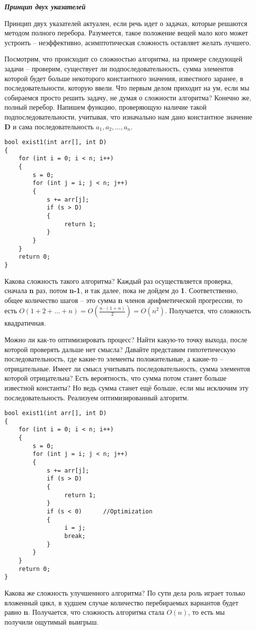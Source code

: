 \documentclass [a4paper,12pt] {report}
\begin{document}
\begin{center}
{\Large \bfseries \slshape Принцип двух указателей}
\end{center}

Принцип двух указателей актуален, если речь идет о задачах, которые решаются методом полного перебора. Разумеется, такое положение вещей мало кого может устроить – неэффективно, асимптотическая сложность оставляет желать лучшего. 

Посмотрим, что происходит со сложностью алгоритма, на примере следующей задачи – проверим, существует ли подпоследовательность, сумма элементов которой будет больше некоторого константного значения, известного заранее, в последовательности, которую ввели. Что первым делом приходит на ум, если мы собираемся просто решить задачу, не думая о сложности алгоритма? Конечно же, полный перебор. Напишем функцию, проверяющую наличие такой подпоследовательности, учитывая, что изначально нам дано константное значение {\bfseries  D} и сама последовательность {\bfseries  $a_{1}, a_{2}, … , a_{n}$}.

\lstset {language = C++, frame = single}
\begin{lstlisting}
bool exist1(int arr[], int D)
{
    for (int i = 0; i < n; i++)
    {
        s = 0;
        for (int j = i; j < n; j++)
        {
            s += arr[j];
            if (s > D)
            {
                 return 1;
            }
        }
    }
	return 0;
}
\end{lstlisting}

Какова сложность такого алгоритма? Каждый раз осуществляется проверка, сначала {\bfseries n} раз, потом {\bfseries n-1}, и так далее, пока не дойдем до {\bfseries 1}. Соответственно, общее количество шагов – это сумма {\bfseries n} членов арифметической прогрессии, то есть $O(1 + 2 + … + n) = O(\frac {n \cdot (1+n)} {2}) = O(n^2)$. Получается, что сложность квадратичная.

Можно ли как-то оптимизировать процесс? Найти какую-то точку выхода, после которой проверять дальше нет смысла? Давайте представим гипотетическую последовательность, где какие-то элементы положительные, а какие-то – отрицательные. Имеет ли смысл учитывать последовательность, сумма элементов которой отрицательна? Есть вероятность, что сумма потом станет больше известной константы? Но ведь сумма станет ещё больше, если мы исключим эту последовательность. Реализуем оптимизированный алгоритм.

\begin{lstlisting}
bool exist1(int arr[], int D)
{
    for (int i = 0; i < n; i++)
    {
        s = 0;
        for (int j = i; j < n; j++)
        {
            s += arr[j];
            if (s > D)
            {
                 return 1;
            }
            if (s < 0)		//Optimization
            {
                 i = j;
                 break;
            }
        }
    }
	return 0;
}
\end{lstlisting}

Какова же сложность улучшенного алгоритма? По сути дела роль играет только вложенный цикл, в худшем случае количество перебираемых вариантов будет равно {\bfseries n}. Получается, что сложность алгоритма стала $O(n)$, то есть мы получили ощутимый выигрыш.
\end{document}
